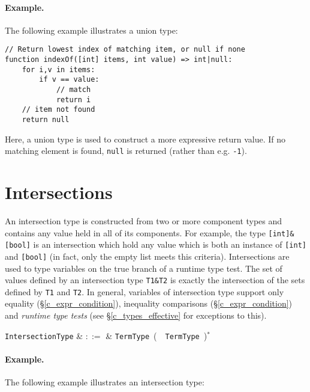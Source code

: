 \paragraph{Example.} The following example illustrates a union type:

\begin{lstlisting}
// Return lowest index of matching item, or null if none
function indexOf([int] items, int value) => int|null:
    for i,v in items:
        if v == value:
            // match
            return i
    // item not found
    return null
\end{lstlisting}

Here, a union type is used to construct a more expressive return value.  If no matching element is found, \lstinline{null} is returned (rather than e.g. \lstinline{-1}).


\section{Intersections}
\label{c_types_intersections}

An intersection type is constructed from two or more component types and contains any value held in all of its components.  For example, the type \lstinline{[int]&[bool]} is an intersection which hold any value which is both an instance of \lstinline{[int]} and \lstinline{[bool]} (in fact, only the empty list meets this criteria).  Intersections are used to type variables on the true branch of a runtime type test.  The set of values defined by an intersection type \lstinline{T1&T2} is exactly the intersection of the sets defined by \lstinline{T1} and \lstinline{T2}.  In general, variables of intersection type support only equality (\S\ref{c_expr_condition}), inequality comparisons (\S\ref{c_expr_condition}) and {\em runtime type tests} (see \S\ref{c_types_effective} for exceptions to this).

\begin{syntax}
  \verb+IntersectionType+ & $::=$ & \verb+TermType+\ \big(\ \token{\&}\ \verb+TermType+\
  \big)$^*$\\
\end{syntax}

\paragraph{Example.} The following example illustrates an intersection type:

